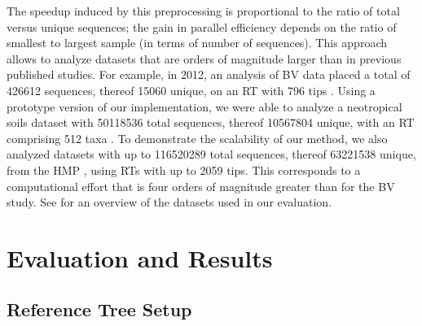 The speedup induced by this preprocessing is proportional to the ratio of total versus unique sequences;
the gain in parallel efficiency depends on the ratio of smallest to largest sample (in terms of number of sequences).
This approach allows to analyze datasets that are orders of magnitude larger than in previous published studies.
For example, in 2012, an analysis of \acf{BV} data
placed a total of \num{426 612} sequences, thereof \num{15 060} unique,
on an \ac{RT} with \num{796} tips \citep{Srinivasan2012}.
Using a prototype version of our implementation,
we were able to analyze a neotropical soils dataset with \num{50 118 536} total sequences, thereof \num{10 567 804} unique,
with an \ac{RT} comprising \num{512} taxa \citep{Mahe2017}.
To demonstrate the scalability of our method,
we also analyzed datasets with up to \num{116 520 289} total sequences, thereof \num{63 221 538} unique,
from the \ac{HMP} \citep{Huttenhower2012,Methe2012}, using \acp{RT} with up to \num{2 059} tips.
This corresponds to %
a computational effort that is four orders of magnitude greater than for the \ac{BV} study.
See  for an overview of the datasets used in our evaluation.


\section{Evaluation and Results}
\label{ch:AutomaticTrees:sec:Evaluation}


\subsection{Reference Tree Setup}
\label{ch:AutomaticTrees:sec:Evaluation:sub:ReferenceTreeSetup}

